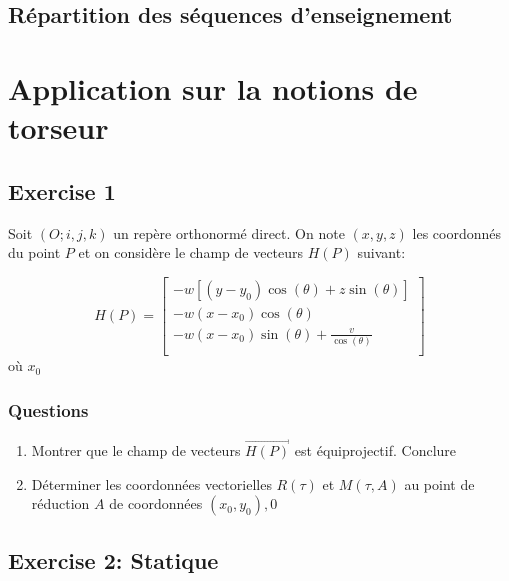 \documentclass[
]{book}
\begin{document}
\hypertarget{ruxe9partition-des-suxe9quences-denseignement}{%
\section*{Répartition des séquences d'enseignement}\label{ruxe9partition-des-suxe9quences-denseignement}}

\hypertarget{application-sur-la-notions-de-torseur}{%
\chapter{Application sur la notions de torseur}\label{application-sur-la-notions-de-torseur}}

\hypertarget{exercise-1}{%
\section{Exercise 1}\label{exercise-1}}

Soit \((O;i, j, k)\) un repère orthonormé direct. On note \((x, y, z)\) les coordonnés du point \(P\) et on considère le champ de vecteurs \(H(P)\) suivant:

\[
H(P) = 
\begin{bmatrix}
-w[(y - y_{0}) \cos(\theta) + z\sin(\theta) ] \\
-w(x - x_{0}) \cos(\theta) \\
-w(x - x_{0}) \sin(\theta) + \frac{v}{\cos(\theta)} \\
\end{bmatrix}
\]
où \(x_{0}\)

\hypertarget{questions}{%
\subsection*{Questions}\label{questions}}

\begin{enumerate}
\def\labelenumi{\arabic{enumi}.}
\item
  Montrer que le champ de vecteurs \(\vec{H(P)}\) est équiprojectif. Conclure
\item
  Déterminer les coordonnées vectorielles \(R(\tau)\) et \(M(\tau, A)\) au point de réduction \(A\) de coordonnées \((x_{0}, y_{0}), 0\)
\end{enumerate}

\hypertarget{exercise-2-statique}{%
\section{Exercise 2: Statique}\label{exercise-2-statique}}
\end{document}
